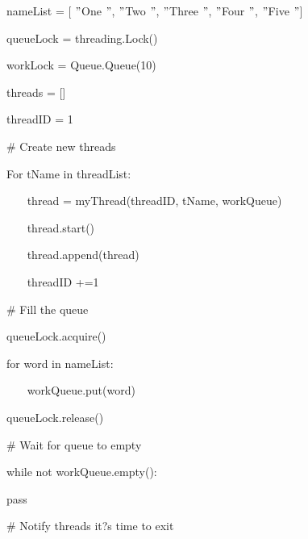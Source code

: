 \documentclass [12pt,a4paper,notitlepage,oneside,bahasa]{article}
\begin{document}
\noindent 
{\fontsize{10pt}{10pt}\selectfont nameList = [ $ " $One $ " $,  $ " $Two $ " $,  $ " $Three $ " $,  $ " $Four $ " $,  $ " $Five $ " $]} \par
\noindent 
{\fontsize{10pt}{10pt}\selectfont queueLock = threading.Lock()} \par
\noindent 
{\fontsize{10pt}{10pt}\selectfont workLock = Queue.Queue(10)} \par
\noindent 
{\fontsize{10pt}{10pt}\selectfont threads = []} \par
\noindent 
{\fontsize{10pt}{10pt}\selectfont threadID = 1} \par
\vspace{10pt}
\noindent 
{\fontsize{10pt}{10pt}\selectfont  $  \#  $ Create new threads} \par
\noindent 
{\fontsize{10pt}{10pt}\selectfont For tName in threadList:} \par
\noindent 
{\fontsize{10pt}{10pt}\selectfont ~~~ thread = myThread(threadID, tName, workQueue)} \par
\noindent 
{\fontsize{10pt}{10pt}\selectfont ~~~ thread.start()} \par
\noindent 
{\fontsize{10pt}{10pt}\selectfont ~~~ thread.append(thread)} \par
\noindent 
{\fontsize{10pt}{10pt}\selectfont ~~~ threadID +=1} \par
\vspace{10pt}
\noindent 
{\fontsize{10pt}{10pt}\selectfont  $  \#  $ Fill the queue} \par
\noindent 
{\fontsize{10pt}{10pt}\selectfont queueLock.acquire()} \par
\noindent 
{\fontsize{10pt}{10pt}\selectfont for word in nameList:} \par
\noindent 
{\fontsize{10pt}{10pt}\selectfont ~~~ workQueue.put(word)} \par
\noindent 
{\fontsize{10pt}{10pt}\selectfont queueLock.release()} \par
\vspace{10pt}
\noindent 
{\fontsize{10pt}{10pt}\selectfont  $  \#  $ Wait for queue to empty} \par
\noindent 
{\fontsize{10pt}{10pt}\selectfont while not workQueue.empty():} \par
\noindent 
{\fontsize{10pt}{10pt}\selectfont pass} \par
\vspace{10pt}
\noindent 
{\fontsize{10pt}{10pt}\selectfont  $  \#  $ Notify threads it?s time to exit} \par
\end{document}
